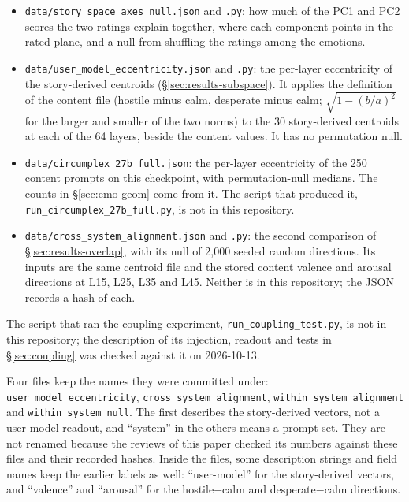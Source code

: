 \documentclass[11pt,a4paper]{article}
\begin{document}
\begin{itemize}
  \item \texttt{data/\allowbreak story\_space\_axes\_null.json} and \texttt{.py}: how much of the PC1 and PC2 scores the two ratings explain together, where each component points in the rated plane, and a null from shuffling the ratings among the emotions.
  \item \texttt{data/\allowbreak user\_model\_eccentricity.json} and \texttt{.py}: the per-layer eccentricity of the story-derived centroids (\S\ref{sec:results-subspace}). It applies the definition of the content file (hostile minus calm, desperate minus calm; $\sqrt{1 - (b/a)^2}$ for the larger and smaller of the two norms) to the 30 story-derived centroids at each of the 64 layers, beside the content values. It has no permutation null.
  \item \texttt{data/\allowbreak circumplex\_27b\_full.json}: the per-layer eccentricity of the 250 content prompts on this checkpoint, with permutation-null medians. The counts in \S\ref{sec:emo-geom} come from it. The script that produced it, \texttt{run\_circumplex\_27b\_full.py}, is not in this repository.
  \item \texttt{data/\allowbreak cross\_system\_alignment.json} and \texttt{.py}: the second comparison of \S\ref{sec:results-overlap}, with its null of 2,000 seeded random directions. Its inputs are the same centroid file and the stored content valence and arousal directions at L15, L25, L35 and L45. Neither is in this repository; the JSON records a hash of each.
\end{itemize}

The script that ran the coupling experiment, \texttt{run\_coupling\_test.py}, is not in this repository; the description of its injection, readout and tests in \S\ref{sec:coupling} was checked against it on 2026-10-13.

Four files keep the names they were committed under: \texttt{user\_model\_eccentricity}, \texttt{cross\_system\_alignment}, \texttt{within\_system\_alignment} and \texttt{within\_system\_null}. The first describes the story-derived vectors, not a user-model readout, and ``system'' in the others means a prompt set. They are not renamed because the reviews of this paper checked its numbers against these files and their recorded hashes. Inside the files, some description strings and field names keep the earlier labels as well: ``user-model'' for the story-derived vectors, and ``valence'' and ``arousal'' for the hostile$-$calm and desperate$-$calm directions.
\end{document}
